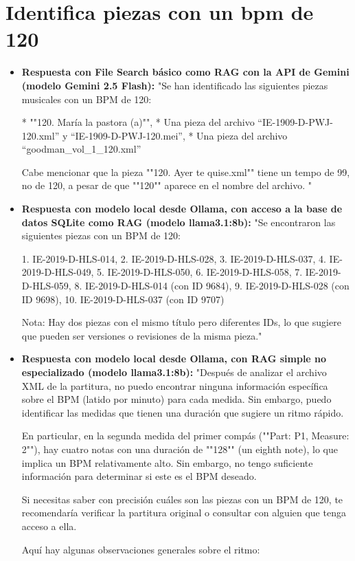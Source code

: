 \section{Identifica piezas con un bpm de 120}
\begin{itemize}
    \item \textbf{Respuesta con File Search básico como RAG con la API de Gemini (modelo Gemini 2.5 Flash):} "Se han identificado las siguientes piezas musicales con un BPM de 120:

* ""120. María la pastora (a)"",
* Una pieza del archivo ``IE-1909-D-PWJ-120.xml'' y ``IE-1909-D-PWJ-120.mei'',
* Una pieza del archivo ``goodman\_vol\_1\_120.xml''

Cabe mencionar que la pieza ""120. Ayer te quise.xml"" tiene un tempo de 99, no de 120, a pesar de que ""120"" aparece en el nombre del archivo.
"
    \item \textbf{Respuesta con modelo local desde Ollama, con acceso a la base de datos SQLite como RAG (modelo llama3.1:8b):} "Se encontraron las siguientes piezas con un BPM de 120:

1. IE-2019-D-HLS-014,
2. IE-2019-D-HLS-028,
3. IE-2019-D-HLS-037,
4. IE-2019-D-HLS-049,
5. IE-2019-D-HLS-050,
6. IE-2019-D-HLS-058,
7. IE-2019-D-HLS-059,
8. IE-2019-D-HLS-014 (con ID 9684),
9. IE-2019-D-HLS-028 (con ID 9698),
10. IE-2019-D-HLS-037 (con ID 9707)

Nota: Hay dos piezas con el mismo título pero diferentes IDs, lo que sugiere que pueden ser versiones o revisiones de la misma pieza."
    \item \textbf{Respuesta con modelo local desde Ollama, con RAG simple no especializado (modelo llama3.1:8b):} "Después de analizar el archivo XML de la partitura, no puedo encontrar ninguna información específica sobre el BPM (latido por minuto) para cada medida. Sin embargo, puedo identificar las medidas que tienen una duración que sugiere un ritmo rápido.

En particular, en la segunda medida del primer compás (""Part: P1, Measure: 2""), hay cuatro notas con una duración de ""128"" (un eighth note), lo que implica un BPM relativamente alto. Sin embargo, no tengo suficiente información para determinar si este es el BPM deseado.

Si necesitas saber con precisión cuáles son las piezas con un BPM de 120, te recomendaría verificar la partitura original o consultar con alguien que tenga acceso a ella.

Aquí hay algunas observaciones generales sobre el ritmo:


\end{itemize}
